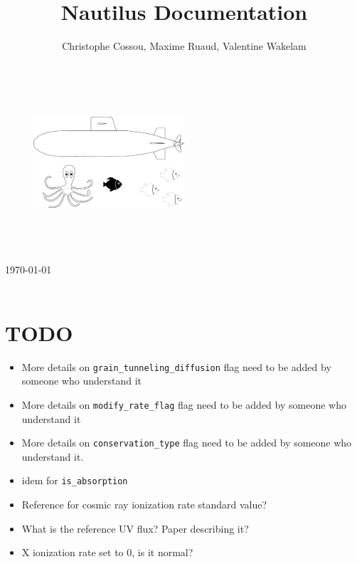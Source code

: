 \documentclass[english,a4paper,twoside]{article}
\title{Nautilus Documentation}
\author{Christophe Cossou, Maxime Ruaud, Valentine Wakelam}
\begin{document}
\begin{titlepage}
\begin{center}
~
\vfill
\begin{figure}[t]
\centering
\includegraphics[width=0.5\textwidth]{figures/nautilus_logo.pdf}%
\end{figure}

\HRule \\[0.4cm]
{ \huge \bfseries \makeatletter\@title\makeatother}\\[0.4cm]

\HRule \\[0.75cm]
{\large \today}\\[0.75cm]
\makeatletter
\@author
\makeatother
\vfill
\vfill
~


\end{center}
\end{titlepage}

\cleardoublepage

\tableofcontents

\cleardoublepage

\section{TODO}
\begin{itemize}
\item More details on \verb|grain_tunneling_diffusion| flag need to be added by someone who understand it
\item More details on \verb|modify_rate_flag| flag need to be added by someone who understand it
\item More details on \verb|conservation_type| flag need to be added by someone who understand it.
\item idem for \verb|is_absorption|
\item Reference for cosmic ray ionization rate standard value?
\item What is the reference UV flux? Paper describing it?
\item X ionization rate set to 0, is it normal?
\end{itemize}
\end{document}
